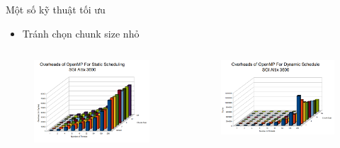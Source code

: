\documentclass[10pt]{beamer}
\theoremstyle{remark}
\numberwithin{algocf}{section}
\numberwithin{equation}{section}
\numberwithin{dl}{section}
\numberwithin{figure}{section}
\begin{document}
\begin{frame}[fragile]{Một số kỹ thuật tối ưu}
    \begin{itemize}
        \item Tránh chọn chunk size nhỏ
    \end{itemize}
    \begin{columns}[onlytextwidth]
        \begin{column}{0.5\linewidth}
            \begin{figure}[H]
                \centering
                \includegraphics[width=0.9\linewidth]{figures/OpenMP/Overhead_Static_Scheduling_Chunk_Size.png}
            \end{figure}
        \end{column}
        \begin{column}{0.5\linewidth}
            \begin{figure}[H]
                \centering
                \includegraphics[width=0.9\linewidth]{figures/OpenMP/Overhead_Dynamic_Scheduling_Chunk_Size.png}
            \end{figure}
        \end{column}
    \end{columns}
\end{frame}
\end{document}
